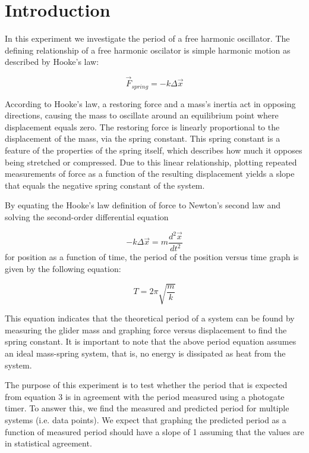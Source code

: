 \documentclass[11pt]{article}
\begin{document}
\section{Introduction}
{
In this experiment we investigate the period of a free harmonic oscillator. The defining relationship of a free harmonic oscilator is simple harmonic motion as described by Hooke's law:

\begin{equation}
    \vec{F}_{spring} = -k\Delta \vec{x}
\end{equation}

According to Hooke's law, a restoring force and a mass's inertia act in opposing directions, causing the mass to oscillate around an equilibrium point where displacement equals zero. The restoring force is linearly proportional to the displacement of the mass, via the spring constant. This spring constant is a feature of the properties of the spring itself, which describes how much it opposes being stretched or compressed. Due to this linear relationship, plotting repeated measurements of force as a function of the resulting displacement yields a slope that equals the negative spring constant of the system.

By equating the Hooke's law definition of force to Newton's second law and solving the second-order differential equation 

\begin{equation}
    -k\Delta\vec{x}=m\frac{d^2\vec{x}}{dt^2}
\end{equation}
for position as a function of time, the period of the position versus time graph is given by the following equation:

\begin{equation}
    T = 2\pi \sqrt{\frac{m}{k}}
\end{equation}

This equation indicates that the theoretical period of a system can be found by measuring the glider mass and graphing force versus displacement to find the spring constant. It is important to note that the above period equation assumes an ideal mass-spring system, that is, no energy is dissipated as heat from the system.

The purpose of this experiment is to test whether the period that is expected from equation 3 is in agreement with the period measured using a photogate timer. To answer this, we find the measured and predicted period for multiple systems (i.e. data points). We expect that graphing the predicted period as a function of measured period should have a slope of 1 assuming that the values are in statistical agreement.
}
\end{document}
